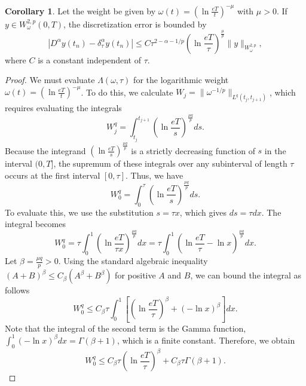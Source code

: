 \documentclass[12pt,a4paper]{article}
\theoremstyle{definition}
\newtheorem{corollary}{Corollary}
\begin{document}
\begin{corollary}\label{cor3}
Let the weight be given by $\omega(t) = \left(\ln \frac{eT}{t}\right)^{-\mu}$ with $\mu > 0$. If $y \in W^{2,p}_\omega(0,T)$, the discretization error is bounded by
\begin{equation}
    |D^\alpha y(t_n) - \delta_\tau^\alpha y(t_n)| \le C \tau^{2 - \alpha - 1/p} \left(\ln \frac{eT}{\tau}\right)^{\frac{\mu}{p}} \|y\|_{W^{2,p}_\omega},
\end{equation}
where $C$ is a constant independent of $\tau$.
\end{corollary}

\begin{proof}
We must evaluate $\Lambda(\omega, \tau)$ for the logarithmic weight $\omega(t) = \left(\ln \frac{eT}{t}\right)^{-\mu}$. To do this, we calculate $W_j = \|\omega^{-1/p}\|_{L^q(t_j, t_{j+1})}$, which requires evaluating the integrals
\begin{equation}
    W_j^q = \int_{t_j}^{t_{j+1}} \left(\ln \frac{eT}{s}\right)^{\frac{\mu q}{p}} ds.
\end{equation}
Because the integrand $\left(\ln \frac{eT}{s}\right)^{\frac{\mu q}{p}}$ is a strictly decreasing function of $s$ in the interval $(0, T]$, the supremum of these integrals over any subinterval of length $\tau$ occurs at the first interval $[0, \tau]$. Thus, we have
\begin{equation}
    W_0^q = \int_0^\tau \left(\ln \frac{eT}{s}\right)^{\frac{\mu q}{p}} ds.
\end{equation}
To evaluate this, we use the substitution $s = \tau x$, which gives $ds = \tau dx$. The integral becomes
\begin{equation}
    W_0^q = \tau \int_0^1 \left(\ln \frac{eT}{\tau x}\right)^{\frac{\mu q}{p}} dx = \tau \int_0^1 \left(\ln \frac{eT}{\tau} - \ln x\right)^{\frac{\mu q}{p}} dx.
\end{equation}
Let $\beta = \frac{\mu q}{p} > 0$. Using the standard algebraic inequality $(A+B)^\beta \le C_\beta(A^\beta + B^\beta)$ for positive $A$ and $B$, we can bound the integral as follows
\begin{equation}
    W_0^q \le C_\beta \tau \int_0^1 \left[ \left(\ln \frac{eT}{\tau}\right)^\beta + (-\ln x)^\beta \right] dx.
\end{equation}
Note that the integral of the second term is the Gamma function, $\int_0^1 (-\ln x)^\beta dx = \Gamma(\beta+1)$, which is a finite constant. Therefore, we obtain
\begin{equation}
    W_0^q \le C_\beta \tau \left(\ln \frac{eT}{\tau}\right)^\beta + C_\beta \tau \Gamma(\beta+1).

\end{equation}
\end{proof}
\end{document}
